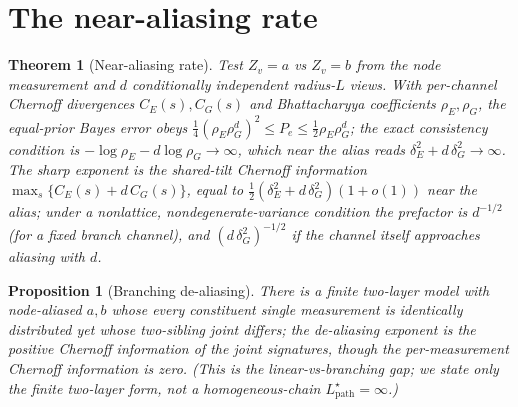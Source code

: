 \documentclass[11pt]{article}
\theoremstyle{plain}
\newtheorem{theorem}{Theorem}\newtheorem{proposition}{Proposition}\newtheorem{corollary}{Corollary}
\theoremstyle{definition}\newtheorem{definition}{Definition}\newtheorem{assumption}{Assumption}
\newcommand{\Lpath}{L^\star_{\mathrm{path}}}\newcommand{\Lstr}{L^\star_{\mathrm{struct}}}
\begin{document}
\section{The near-aliasing rate}\label{sec:rate}
\begin{theorem}[Near-aliasing rate]\label{thm:rate}
Test $Z_v=a$ vs $Z_v=b$ from the node measurement and $d$ conditionally independent radius-$L$ views. With
per-channel Chernoff divergences $C_E(s),C_G(s)$ and Bhattacharyya coefficients $\rho_E,\rho_G$, the equal-prior
Bayes error obeys $\tfrac14(\rho_E\rho_G^d)^2\le P_e\le\tfrac12\rho_E\rho_G^d$; the exact consistency condition is
$-\log\rho_E-d\log\rho_G\to\infty$, which \emph{near the alias} reads $\delta_E^2+d\,\delta_G^2\to\infty$. The sharp
exponent is the shared-tilt Chernoff information $\max_s\{C_E(s)+d\,C_G(s)\}$, equal to
$\tfrac12(\delta_E^2+d\,\delta_G^2)(1+o(1))$ near the alias; under a nonlattice, nondegenerate-variance condition
the prefactor is $d^{-1/2}$ (for a fixed branch channel), and $(d\,\delta_G^2)^{-1/2}$ if the channel itself
approaches aliasing with $d$.
\end{theorem}
\begin{proposition}[Branching de-aliasing]\label{prop:branch}
There is a finite two-layer model with node-aliased $a,b$ whose every constituent single measurement is identically
distributed yet whose two-sibling joint differs; the de-aliasing exponent is the positive Chernoff information of
the joint signatures, though the per-measurement Chernoff information is zero. (This is the linear-vs-branching gap;
we state only the finite two-layer form, not a homogeneous-chain $\Lpath=\infty$.)
\end{proposition}
\end{document}
